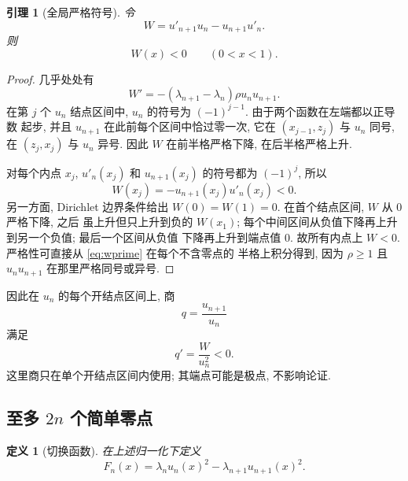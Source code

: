 \documentclass[UTF8]{ctexart}
\newtheorem{lemma}[theorem]{引理}
\newtheorem{definition}[theorem]{定义}
\begin{document}
\begin{lemma}[全局严格符号]\label{lem:wronskian}
令
\begin{equation*}
	W=u'_{n+1}u_n-u_{n+1}u'_n .
\end{equation*}
则
\begin{equation}
	W(x)<0\qquad(0<x<1) .
	\label{eq:wneg}
\end{equation}
\end{lemma}

\begin{proof}
几乎处处有
\begin{equation}
	W'=-(\lambda_{n+1}-\lambda_n)\rho u_n u_{n+1} .
	\label{eq:wprime}
\end{equation}
在第 $j$ 个 $u_n$ 结点区间中, $u_n$ 的符号为 $(-1)^{j-1}$. 由于两个函数在左端都以正导数
起步, 并且 $u_{n+1}$ 在此前每个区间中恰过零一次, 它在 $(x_{j-1},z_j)$ 与 $u_n$ 同号, 在
$(z_j,x_j)$ 与 $u_n$ 异号. 因此 $W$ 在前半格严格下降, 在后半格严格上升.

对每个内点 $x_j$, $u'_n(x_j)$ 和 $u_{n+1}(x_j)$ 的符号都为 $(-1)^j$, 所以
\begin{equation}
	W(x_j)=-u_{n+1}(x_j)u'_n(x_j)<0 .
	\label{eq:wxj}
\end{equation}
另一方面, Dirichlet 边界条件给出 $W(0)=W(1)=0$. 在首个结点区间, $W$ 从 $0$ 严格下降, 之后
虽上升但只上升到负的 $W(x_1)$; 每个中间区间从负值下降再上升到另一个负值; 最后一个区间从负值
下降再上升到端点值 $0$. 故所有内点上 $W<0$. 严格性可直接从 \eqref{eq:wprime} 在每个不含零点的
半格上积分得到, 因为 $\rho\ge1$ 且 $u_nu_{n+1}$ 在那里严格同号或异号.
\end{proof}

因此在 $u_n$ 的每个开结点区间上, 商
\begin{equation}
	q=\frac{u_{n+1}}{u_n}
\end{equation}
满足
\begin{equation}
	q'=\frac{W}{u_n^2}<0 .
	\label{eq:qprime}
\end{equation}
这里商只在单个开结点区间内使用; 其端点可能是极点, 不影响论证.

\subsection{至多 \texorpdfstring{$2n$}{2n} 个简单零点}

\begin{definition}[切换函数]\label{def:switch}
在上述归一化下定义
\begin{equation}
	F_n(x)=\lambda_n u_n(x)^2-\lambda_{n+1}u_{n+1}(x)^2 .
	\label{eq:fn}
\end{equation}
\end{definition}
\end{document}
